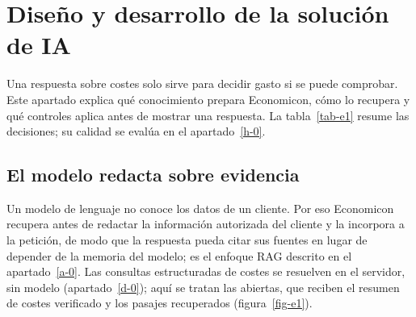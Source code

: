 \section{Diseño y desarrollo de la solución de IA}\label{e-0}

Una respuesta sobre costes solo sirve para decidir gasto si se puede comprobar. Este apartado explica qué conocimiento prepara Economicon, cómo lo recupera y qué controles aplica antes de mostrar una respuesta. La tabla~\ref{tab-e1} resume las decisiones; su calidad se evalúa en el apartado~\ref{h-0}. \cite{config-gateway,especificaciones,arquitectura,informe-rag,evaluacion}
\subsection{El modelo redacta sobre evidencia}\label{e-1}

Un modelo de lenguaje no conoce los datos de un cliente. Por eso Economicon recupera antes de redactar la información autorizada del cliente y la incorpora a la petición, de modo que la respuesta pueda citar sus fuentes en lugar de depender de la memoria del modelo; es el enfoque RAG descrito en el apartado~\ref{a-0}. Las consultas estructuradas de costes se resuelven en el servidor, sin modelo (apartado~\ref{d-0}); aquí se tratan las abiertas, que reciben el resumen de costes verificado y los pasajes recuperados (figura~\ref{fig-e1}). \cite{especificaciones}

